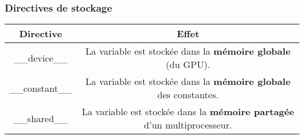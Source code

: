 \begin{frame}
    \frametitle{Directives de stockage}
    \renewcommand{\arraystretch}{2}
    \begin{tabular}{|c|c|}
        \hline
        \rowcolor{lightgray} Directive & Effet \\ \hline
        \_\_device\_\_ & \begin{minipage}{0.8\textwidth}
            La variable est stockée dans la {\bf mémoire globale} (du GPU). 
        \end{minipage} \\ \hline
        \_\_constant\_\_ & \begin{minipage}{0.8\textwidth}
            La variable est stockée dans la {\bf mémoire globale} des constantes.
        \end{minipage} \\ \hline
        \_\_shared\_\_ & \begin{minipage}{0.8\textwidth}
            La variable est stockée dans la {\bf mémoire partagée} d'un multiprocesseur.
        \end{minipage} \\ \hline
    \end{tabular}
\end{frame}

